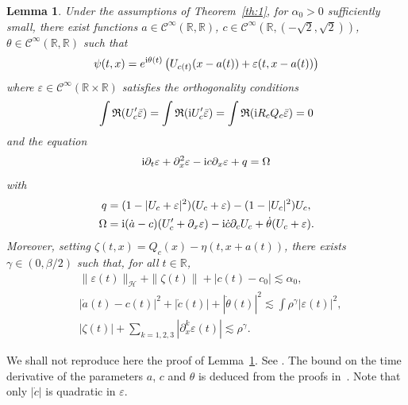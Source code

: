 \documentclass[11pt]{amsart}
\newtheorem{lemma}{Lemma}
\theoremstyle{remark}
\newcommand\RR{\mathbb{R}}
\newcommand\cC{\mathcal{C}}
\newcommand\cH{\mathcal{H}}
\newcommand\ep{\varepsilon}
\newcommand\ii{\textnormal{i}}
\renewcommand{\Re}{\mathfrak{R}}
\begin{document}
\begin{lemma}\label{le:01}
Under the assumptions of Theorem~\ref{th:1}, for $\alpha_0>0$ sufficiently small, there exist
 functions $a\in \cC^\infty(\RR,\RR)$, $c\in \cC^\infty(\RR,(-\sqrt2,\sqrt2))$, $\theta\in\cC^\infty(\RR,\RR)$
such that
\[
\psi(t,x)= e^{\ii\theta(t)}\left(U_{c(t)}(x-a(t))+\ep(t,x-a(t))\right)
\]
where $\ep\in\cC^\infty(\RR\times\RR)$ satisfies the orthogonality conditions
\[
\int \Re(U'_c \bar \ep)=\int \Re (\ii U'_c \bar \ep)=\int \Re(\ii R_cQ_c \bar \ep)=0
\]
and the equation
\[
\ii \partial_t\ep +\partial_x^2\ep -\ii c\partial_x \ep+q=\Omega
\]
with
\begin{align*}
q&=(1-|U_c+\ep|^2)(U_c+\ep)-(1-|U_c|^2) U_c,\\
\Omega&=\ii (\dot a-c) (U_c'+\partial_x\ep)-\ii \dot c\partial_c U_c + \dot \theta(U_c+\ep).
\end{align*}
Moreover, setting $\zeta(t,x)=Q_c(x)-\eta(t,x+a(t))$,
there exists $\gamma\in (0,\beta/2)$ such that, for all $t\in\RR$,
\begin{align*}
&\|\ep(t)\|_\cH+\|\zeta(t)\|+|c(t)-c_0|\lesssim \alpha_0,\\
&|\dot a(t)- c(t) |^2+|\dot c(t)|+|\dot\theta(t)|^2 \lesssim \int \rho^\gamma|\ep(t)|^2,\\
&|\zeta(t)|+\sum_{k=1,2,3} |\partial_x^k \ep(t)| \lesssim \rho^\gamma.
\end{align*}
\end{lemma}
We shall not reproduce here the proof of Lemma~\ref{le:01}. See
\cite{BGS1,GS15}.
The bound on the time derivative of the parameters $a$, $c$ and $\theta$
is deduced from the proofs in~\cite{BGS1,GS15}. Note that only $|\dot c|$ is quadratic in
$\ep$.
\end{document}
